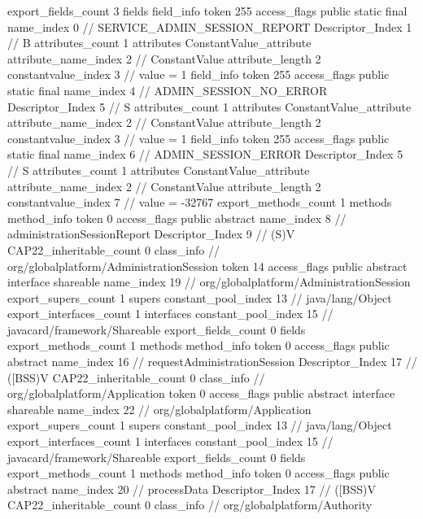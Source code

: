 {{{{			}
			export_fields_count	3
			fields {
			field_info {
				token	255
				access_flags	public static final
				name_index	0		// SERVICE_ADMIN_SESSION_REPORT
				Descriptor_Index	1		// B
				attributes_count	1
				attributes {
				ConstantValue_attribute {
					attribute_name_index	2		// ConstantValue
					attribute_length	2
					constantvalue_index	3		// value = 1
				}
				}
			}
			field_info {
				token	255
				access_flags	public static final
				name_index	4		// ADMIN_SESSION_NO_ERROR
				Descriptor_Index	5		// S
				attributes_count	1
				attributes {
				ConstantValue_attribute {
					attribute_name_index	2		// ConstantValue
					attribute_length	2
					constantvalue_index	3		// value = 1
				}
				}
			}
			field_info {
				token	255
				access_flags	public static final
				name_index	6		// ADMIN_SESSION_ERROR
				Descriptor_Index	5		// S
				attributes_count	1
				attributes {
				ConstantValue_attribute {
					attribute_name_index	2		// ConstantValue
					attribute_length	2
					constantvalue_index	7		// value = -32767
				}
				}
			}
			}
			export_methods_count	1
			methods {
				method_info {
					token	0
					access_flags	public abstract
					name_index	8		// administrationSessionReport
					Descriptor_Index	9		// (S)V
				}
			}
			CAP22_inheritable_count	0
		}
		class_info {		// org/globalplatform/AdministrationSession
			token	14
			access_flags	public abstract interface shareable
			name_index	19		// org/globalplatform/AdministrationSession
			export_supers_count	1
			supers {
				constant_pool_index	13		// java/lang/Object
			}
			export_interfaces_count	1
			interfaces {
				constant_pool_index	15		// javacard/framework/Shareable
			}
			export_fields_count	0
			fields {
			}
			export_methods_count	1
			methods {
				method_info {
					token	0
					access_flags	public abstract
					name_index	16		// requestAdministrationSession
					Descriptor_Index	17		// ([BSS)V
				}
			}
			CAP22_inheritable_count	0
		}
		class_info {		// org/globalplatform/Application
			token	0
			access_flags	public abstract interface shareable
			name_index	22		// org/globalplatform/Application
			export_supers_count	1
			supers {
				constant_pool_index	13		// java/lang/Object
			}
			export_interfaces_count	1
			interfaces {
				constant_pool_index	15		// javacard/framework/Shareable
			}
			export_fields_count	0
			fields {
			}
			export_methods_count	1
			methods {
				method_info {
					token	0
					access_flags	public abstract
					name_index	20		// processData
					Descriptor_Index	17		// ([BSS)V
				}
			}
			CAP22_inheritable_count	0
		}
		class_info {		// org/globalplatform/Authority
}}}
